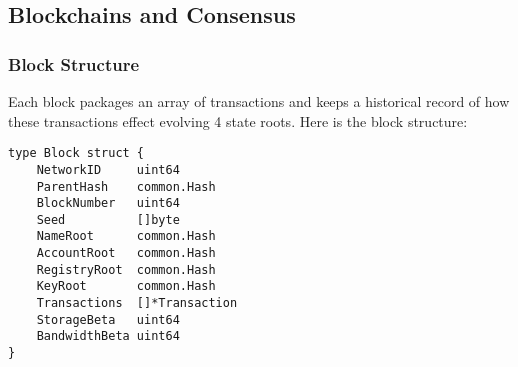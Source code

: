 \documentclass[journal]{IEEEtran}
\begin{document}
\subsection{Blockchains and Consensus}
\label{sec:blockchainconsensus}

\subsubsection{Block Structure}

Each block packages an array of transactions and keeps a historical record of how these transactions effect evolving 4 state roots.  Here is the block structure:

\begin{footnotesize}
\begin{verbatim}
type Block struct {
    NetworkID     uint64
    ParentHash    common.Hash
    BlockNumber   uint64
    Seed          []byte
    NameRoot      common.Hash
    AccountRoot   common.Hash
    RegistryRoot  common.Hash
    KeyRoot       common.Hash
    Transactions  []*Transaction
    StorageBeta   uint64
    BandwidthBeta uint64
}
\end{verbatim}
\end{footnotesize}
\end{document}
